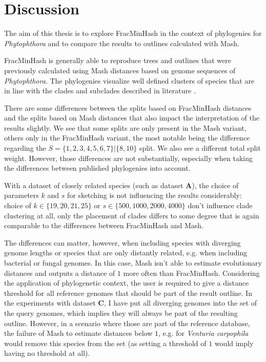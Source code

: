 
\chapter{Discussion}
  \label{sec:diss}

The aim of this thesis is to explore FracMinHash in the context of phylogenies
for \textit{Phytophthora} and to compare the results to outlines calculated with
Mash.

FracMinHash is generally able to reproduce trees and outlines that were
previously calculated using Mash distances based on genome sequences of
\textit{Phytophthora}. The phylogenies visualize well defined clusters of
species that are in line with the clades and subclades described in literature
\cite{abadPhytophthoraTaxonomicPhylogenetic2023a,yangExpandedPhylogenyGenus2017}.

There are some differences between the splits based on FracMinHash distances and
the splits based on Mash distances that also impact the interpretation of the
results slightly. We see that some splits are only present in the Mash variant,
others only in the FracMinHash variant, the most notable being the difference
regarding the $S = \{1, 2, 3, 4, 5, 6, 7\}|\{8, 10\}$ split. We also see a
different total split weight. However, those differences are not substantially,
especially when taking the differences between published phylogenies into
account. 

With a dataset of closely related species (such as dataset \textbf{A}), the
choice of parameters $k$ and $s$ for sketching is not influencing the results
considerably: choice of $k \in \{19, 20, 21, 25\}$ or $s \in \{500, 1000, 2000,
4000\}$ don't influence clade clustering at all, only the placement of clades
differs to some degree that is again comparable to the differences between
FracMinHash and Mash.

The differences can matter, however, when including species with diverging
genome lengths or species that are only distantly related, e.g. when including
bacterial or fungal genomes. In this case, Mash isn't able to estimate
evolutionary distances and outputs a distance of $1$ more often than
FracMinHash. Considering the application of phylogenetic context, the user is
required to give a distance threshold for all reference genomes that should be
part of the result outline. In the experiments with dataset \textbf{C}, I have
put all diverging genomes into the set of the query genomes, which implies they
will always be part of the resulting outline. However, in a scenario where those
are part of the reference database, the failure of Mash to estimate distances
below $1$, e.g. for \textit{Venturia carpophila} would remove this species from
the set (as setting a threshold of $1$ would imply having no threshold at all).

